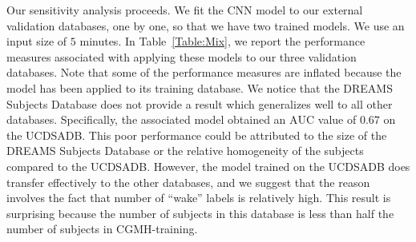 \documentclass[10pt,a4paper,english]{amsart}
\begin{document}
Our sensitivity analysis proceeds. We fit the CNN model to our external validation databases, one by one, so that we have two trained models. We use an input size of $5$ minutes. In Table~\ref{Table:Mix}, we report the performance measures associated with applying these models to our three validation databases. Note that some of the performance measures are inflated because the model has been applied to its training database.
%  
We notice that the DREAMS Subjects Database does not provide a result which generalizes well to all other databases. Specifically, the associated model obtained an $\mathrm{AUC}$ value of $0.67$ on the UCDSADB. This poor performance could be attributed to the size of the DREAMS Subjects Database or the relative homogeneity of the subjects compared to the UCDSADB.  However, the model trained on the UCDSADB does transfer effectively to the other databases, and we suggest that the reason involves the fact that number of ``wake'' labels is relatively high.  This result is surprising because the number of subjects in this database is less than half the number of subjects in CGMH-training. 
\end{document}
